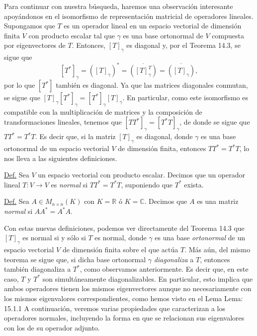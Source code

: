\documentclass[12pt,dvipsnames]{article}
\begin{document}
\vspace{3mm}
Para continuar con nuestra búsqueda, haremos una observación interesante apoyándonos en el isomorfismo de representación matricial de operadores lineales. Supongamos que $T$ es un operador lineal en un espacio vectorial de dimensión finita $V$ con producto escalar tal que $\gamma$ es una base ortonormal de $V$ compuesta por eigenvectores de $T$. Entonces, $[T]_\gamma$ es diagonal y, por el Teorema 14.3, se sigue que $$[T^*]_\gamma=([T]_\gamma)^*=\overline{([T]_\gamma^T)}=\overline{
([T]_\gamma)},$$ por lo que $[T^*]$ también es diagonal. Ya que las matrices diagonales conmutan, se sigue que $[T]_\gamma[T^*]_\gamma=[T^*]_\gamma[T]_\gamma$. En particular, como este isomorfismo es compatible con la multiplicación de matrices y la composición de transformaciones lineales, tenemos que $[TT^*]_\gamma=[T^*T]_\gamma$, de donde se sigue que $TT^*=T^*T$. Es decir que, si la matriz $[T]_\gamma$ es diagonal, donde $\gamma$ es una base ortonormal de un espacio vectorial $V$ de dimensión finita, entonces $TT^*=T^*T$, lo nos lleva a las siguientes definiciones.

\begin{tcolorbox}
    \underline{Def.} Sea $V$ un espacio vectorial con producto escalar. Decimos que un operador lineal $T:V\to V$ es \emph{normal} si $TT^*=T^*T$, suponiendo que $T^*$ exista.

    \vspace{3mm}
    \underline{Def.} Sea $A\in M_{n\times n}(K)$ con $K=\mathbb{R}$ ó $K=\mathbb{C}$. Decimos que $A$ es una matriz \emph{normal} si $AA^*=A^*A$.
\end{tcolorbox}

Con estas nuevas definiciones, podemos ver directamente del Teorema 14.3 que $[T]_\gamma$ es normal si y sólo si $T$ es normal, donde $\gamma$ es una base \emph{ortonormal} de un espacio vectorial $V$ de dimensión finita sobre el que actúa $T$. Más aún, del mismo teorema se sigue que, si dicha base ortonormal $\gamma$ \emph{diagonaliza} a $T$, entonces también diagonaliza a $T^*$, como observamos anteriormente. Es decir que, en este caso, $T$ y $T^*$ son simultáneamente diagonalizables. En particular, esto implica que ambos operadores tienen los mismos eigenvectores \textemdash aunque no necesariamente con los mismos eigenvalores correspondientes, como hemos visto en el Lema Lema: 15.1.1 A continuación, veremos varias propiedades que caracterizan a los operadores normales, incluyendo la forma en que se relacionan sus eigenvalores con los de su operador adjunto.
\end{document}
